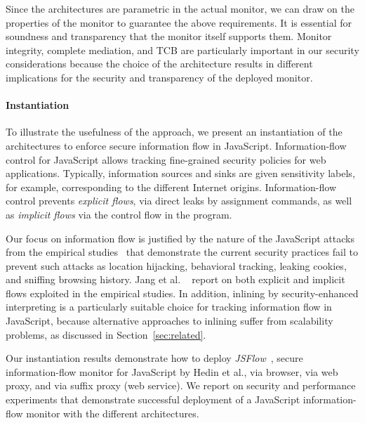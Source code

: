 \documentclass{llncs}
\begin{document}
Since the architectures are parametric in the actual monitor, we can
draw on the properties of the monitor to guarantee the
above requirements. It is essential for soundness and
transparency that the monitor itself supports them. Monitor integrity,
complete mediation, and TCB are particularly important in our security
considerations because the choice of the architecture results in
different implications for the security and transparency of the
deployed monitor.

\paragraph{Instantiation}
To illustrate the usefulness of the approach, we present an
instantiation of the architectures to enforce secure information flow
in JavaScript. Information-flow control for JavaScript allows tracking
fine-grained security policies for web applications. Typically,
information sources  and sinks are given sensitivity labels, for
example, corresponding to the different Internet origins.
Information-flow control prevents \emph{explicit flows}, via
direct leaks by assignment commands, as well as
\emph{implicit flows} via the control flow in the program.

Our focus on information flow is justified by
the nature of the JavaScript attacks from the empirical
studies~\cite{Jang+:CCS10,Nikiforakis+:CCS12} that demonstrate the current security
practices fail to  prevent such attacks as
location
hijacking, behavioral tracking, leaking cookies, and sniffing browsing
history. Jang et al. ~\cite{Jang+:CCS10} report on both explicit and
implicit flows exploited in the empirical studies.
%
In addition, inlining by security-enhanced interpreting is a
particularly suitable choice for tracking information flow in
JavaScript, because alternative approaches to inlining suffer from
scalability problems, as discussed in Section~\ref{sec:related}. 

Our instantiation results demonstrate how to deploy
\emph{JSFlow}~\cite{Hedin:Sabelfeld:CSF12,JSFlow}, secure information-flow
monitor for JavaScript by Hedin et al., via
browser, via web proxy, and via suffix proxy (web service).
%
We report on security and performance experiments that demonstrate successful deployment of a JavaScript
information-flow monitor with the different architectures.


\end{document}
